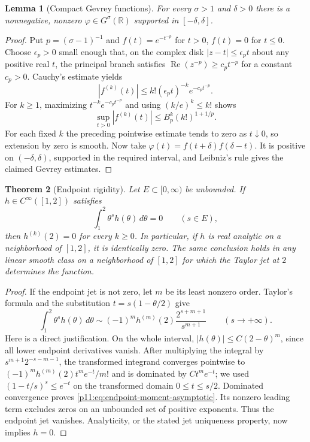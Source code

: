 \documentclass[11pt,letterpaper]{article}
\newtheorem{theorem}{Theorem}[section]
\newtheorem{lemma}[theorem]{Lemma}
\theoremstyle{definition}
\theoremstyle{remark}
\newcommand{\1}{\mathbf 1}
\begin{document}
\begin{lemma}[Compact Gevrey functions]\label{p11:lem:gevrey-bump}
For every $\sigma>1$ and $\delta>0$ there is a nonnegative, nonzero
$\varphi\in G^\sigma(\mathbb R)$ supported in $[-\delta,\delta]$.
\end{lemma}
\begin{proof}
Put $p=(\sigma-1)^{-1}$ and
$f(t)=e^{-t^{-p}}$ for $t>0$, $f(t)=0$ for $t\leq0$.
Choose $\epsilon_p>0$ small enough that, on the complex disk
$|z-t|\leq\epsilon_p t$ about any positive real $t$, the principal branch
satisfies $\operatorname{Re}(z^{-p})\geq c_p t^{-p}$ for a constant
$c_p>0$. Cauchy's estimate yields
\[
 |f^{(k)}(t)|\leq k!(\epsilon_p t)^{-k}e^{-c_pt^{-p}}.
\]
For $k\geq1$, maximizing $t^{-k}e^{-c_pt^{-p}}$ and using
$(k/e)^k\leq k!$ shows
\[
 \sup_{t>0}|f^{(k)}(t)|\leq B_p^k(k!)^{1+1/p}.
\]
For each fixed $k$ the preceding pointwise estimate tends to zero as
$t\downarrow0$, so extension by zero is smooth. Now take
$\varphi(t)=f(t+\delta)f(\delta-t)$. It is positive on
$(-\delta,\delta)$, supported in the required interval, and Leibniz's
rule gives the claimed Gevrey estimates.
\end{proof}

\begin{theorem}[Endpoint rigidity]\label{p11:thm:analytic-rigidity}
Let $E\subset[0,\infty)$ be unbounded. If $h\in C^\infty([1,2])$
satisfies
\[
 \int_1^2\theta^s h(\theta)\,d\theta=0\qquad(s\in E),
\]
then $h^{(k)}(2)=0$ for every $k\geq0$. In particular, if $h$ is real
analytic on a neighborhood of $[1,2]$, it is identically zero.
The same conclusion holds in any linear smooth class on a neighborhood
of $[1,2]$ for which the Taylor jet at $2$ determines the function.
\end{theorem}

\begin{proof}
If the endpoint jet is not zero, let $m$ be its least nonzero order.
Taylor's formula and the substitution $t=s(1-\theta/2)$ give
\begin{equation}\label{p11:eq:endpoint-moment-asymptotic}
 \int_1^2\theta^s h(\theta)\,d\theta
  \sim (-1)^m h^{(m)}(2)\frac{2^{s+m+1}}{s^{m+1}}
       \qquad(s\to+\infty).
\end{equation}
Here is a direct justification. On the whole interval,
$|h(\theta)|\leq C(2-\theta)^m$, since all lower endpoint derivatives
vanish. After multiplying the integral by $s^{m+1}2^{-s-m-1}$,
the transformed integrand converges pointwise to
$(-1)^m h^{(m)}(2)t^m e^{-t}/m!$ and is dominated by $Ct^me^{-t}$;
we used $(1-t/s)^s\leq e^{-t}$ on the transformed domain $0\leq t\leq s/2$.
Dominated convergence proves \eqref{p11:eq:endpoint-moment-asymptotic}.
Its nonzero leading term excludes zeros on an unbounded set of positive
exponents. Thus the endpoint jet vanishes. Analyticity, or the stated
jet uniqueness property, now implies $h=0$.
\end{proof}
\end{document}
